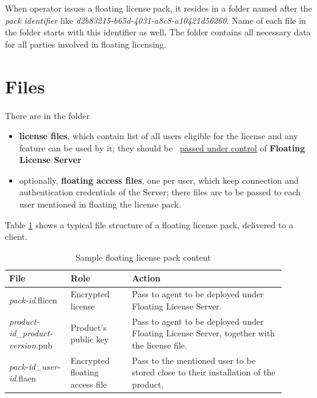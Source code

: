 \documentclass[12pt]{report}
\begin{document}
When operator issues a floating license pack, it resides in a folder named after the \textit{pack identifier} like 
\textit{d2b83215-b65d-4031-a8c8-a10421d56260}. Name of each file in the folder starts with this identifier as well. 
The folder contains all necessary data for all parties involved in floating licensing. 

\section*{Files} \label{sec:flp-files}
There are in the folder
\begin{itemize}
	\item \textbf{license files}, which contain list of all users eligible for the license and any feature can be used by it; they should be ~\hyperref[sec:fls-commands-upload]{passed under control} of \textbf{Floating License Server} 
	\item optionally, \textbf{floating access files}, one per user, which keep connection and authentication credentials of the Server; there files are to be passed to each user mentioned in floating the license pack.
\end{itemize}

Table \ref{tabular:sample-pack-content} shows a typical file structure of a floating license pack, delivered to a client.
\begin{table}[ht]
\caption{Sample floating license pack content}
\label{tabular:sample-pack-content}
\begin{center}
	\begin{tabular}{p{0.2\linewidth}p{0.2\linewidth}p{0.5\linewidth}}
		\textbf{File} & \textbf{Role} & \textbf{Action} \\  \hline
		\textit{pack-id}.flicen & Encrypted license & Pass to agent to be deployed under Floating License Server. \\  \hline
		\textit{product-id}\_\textit{product-version}.pub & Product's public key & Pass to agent to be deployed under Floating License Server, together with the license file. \\ \hline  
		\textit{pack-id}\_\textit{user-id}.flaen & Encrypted floating access file & Pass to the mentioned user to be stored close to their installation of the product. \\  \hline
	\end{tabular}
\end{center}
\end{table}
\end{document}
